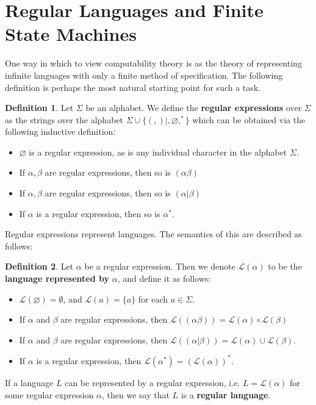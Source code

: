 \documentclass{article}
\theoremstyle{definition}
\newtheorem{definition}{Definition}[section]
\theoremstyle{plain}
\theoremstyle{theorem}
\begin{document}
\section{Regular Languages and Finite State Machines}
\par One way in which to view computability theory is as the theory of representing infinite languages with only a finite method of specification. The following definition is perhaps the most natural starting point for such a task. 
 \begin{definition}
 	Let $\Sigma$ be an alphabet. We define the \textbf{regular expressions} over $\Sigma$ as the strings over the alphabet $\Sigma \cup \{(,)|,\varnothing,^*\}$ which can be obtained via the following inductive definition:
 	\begin{itemize}
 		\item[(i)] $\varnothing$ is a regular expression, as is any individual character in the alphabet $\Sigma$.
 		\item[(ii)] If $\alpha,\beta$ are regular expressions, then so is $(\alpha \beta)$
 		\item[(iii)] If $\alpha,\beta$ are regular expressions, then so is $(\alpha | \beta)$
 		\item[(iv)] If $\alpha$ is a regular expression, then so is $\alpha^*$. 
 	\end{itemize}
 \end{definition}
Regular expressions represent languages. The semantics of this are described as follows:
\begin{definition}
	Let $\alpha$ be a regular expression. Then we denote $\mathcal{L}(\alpha)$ to be the \textbf{language represented by } $\alpha$, and define it as follows:
	\begin{itemize}
		\item[(1)] $\mathcal{L}(\varnothing) = \emptyset$, and $\mathcal{L}(a) = \{a\}$ for each $a \in \Sigma$.
		\item[(2)] If $\alpha$ and $\beta$ are regular expressions, then $\mathcal{L}((\alpha \beta)) = \mathcal{L}(\alpha) \circ \mathcal{L}(\beta)$
		\item[(3)] If $\alpha$ and $\beta$ are regular expressions, then $\mathcal{L}((\alpha | \beta)) = \mathcal{L}(\alpha) \cup \mathcal{L}(\beta)$. 
		\item[(4)] If $\alpha$ is a regular expression, then $\mathcal{L}(\alpha^*) = (\mathcal{L}(\alpha))^*$.
	\end{itemize}
	If a language $L$ can be represented by a regular expression, i.e. $L = \mathcal{L}(\alpha)$ for some regular expression $\alpha$, then we say that $L$ is a \textbf{regular language}.
\end{definition}
\end{document}
